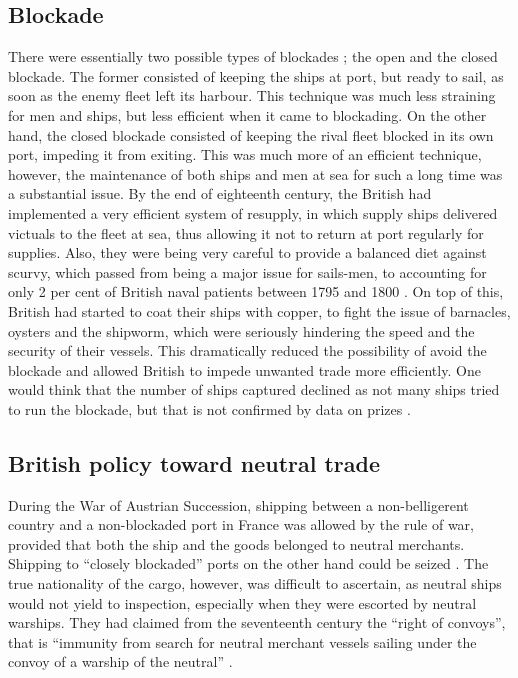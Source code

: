 \documentclass[12pt,a4paper,notitlepage,english]{article}
\begin{document}
\begin{appendix}
\subsection{Blockade}\label{app:appendix_blockade}
There were essentially two possible types of blockades \citep{Corbett2004}; the open and the closed blockade. The former consisted of keeping the ships at port, but ready to sail, as soon as the enemy fleet left its harbour. This technique was much less straining for men and ships, but less efficient when it came to blockading. On the other hand, the closed blockade consisted of keeping the rival fleet blocked in its own port, impeding it from exiting. This was much more of an efficient technique, however, the maintenance of both ships and men at sea for such a long time was a substantial issue.
By the end of eighteenth century, the British had implemented a very efficient system of resupply, in which supply ships delivered victuals to the fleet at sea, thus allowing it not to return at port regularly for supplies. 
Also, they were being very careful to provide a balanced diet against scurvy, which passed from being a major issue for sails-men, to accounting for only 2 per cent of British naval patients between 1795 and 1800 \citep{Rodger2005}. On top of this, British had started to coat their ships with copper, to fight the issue of barnacles, oysters and the shipworm, which were seriously hindering the speed and the security of their vessels. This dramatically reduced the possibility of avoid the blockade and allowed British to impede unwanted trade more efficiently.
One would think that the number of ships captured declined as not many ships tried to run the blockade, but that is not confirmed by data on prizes \cite{Benjamin2009}.




\subsection{British policy toward neutral trade}\label{app:appendix_neutral_policy}

During the War of Austrian Succession, shipping between a non-belligerent country and a non-blockaded port in France was allowed by the rule of war, provided that both the ship and the goods belonged to neutral merchants.
Shipping to ``closely blockaded'' ports on the other hand could be seized \citep[p. 112]{Schnakenbourg2013}.
The true nationality of the cargo, however, was difficult to ascertain, as neutral ships would not yield to inspection, especially when they were escorted by neutral warships.
They had claimed from the seventeenth century the ``right of convoys'', that is ``immunity from search for neutral merchant vessels sailing under the convoy of a warship of the neutral'' \citep[p. 17]{Davis2006}.


\end{appendix}
\end{document}
